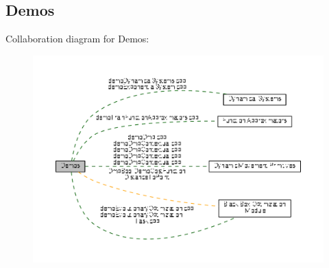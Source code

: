 \hypertarget{group__Demos}{\subsection{Demos}
\label{group__Demos}
}
Collaboration diagram for Demos\+:
\nopagebreak
\begin{figure}[H]
\begin{center}
\leavevmode
\includegraphics[width=350pt]{group__Demos}
\end{center}
\end{figure}
